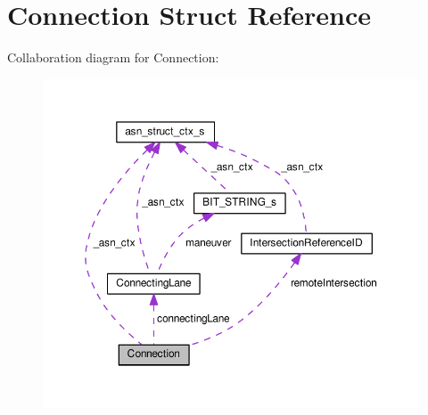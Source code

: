 \hypertarget{structConnection}{}\section{Connection Struct Reference}
\label{structConnection}


Collaboration diagram for Connection\+:\nopagebreak
\begin{figure}[H]
\begin{center}
\leavevmode
\includegraphics[width=350pt]{structConnection__coll__graph}
\end{center}
\end{figure}
